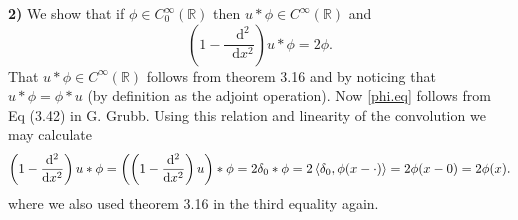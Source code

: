 \documentclass[a4paper,11pt]{article}
\newcommand*\diff{\mathop{}\!\mathrm{d}}
\newcommand{\R}{\mathbb{R}}
\numberwithin{equation}{section}
\begin{document}
\textbf{2)} We show that if $ \phi\in C^\infty_0(\R) $ then $ u\ast\phi\in C^\infty(\R) $ and \begin{equation}\label{phi.eq}
\left(1-\frac{\diff^2}{\diff x^2}\right)u\ast\phi=2\phi.
\end{equation}
That $ u\ast \phi\in C^\infty(\R) $ follows from theorem 3.16 and by noticing that $ u\ast\phi=\phi\ast u $ (by definition as the adjoint operation). Now \eqref{phi.eq} follows from Eq (3.42) in G. Grubb. Using this relation and linearity of the convolution we may calculate\begin{equation}
\left(1-\frac{\diff^2}{\diff x^2}\right)u\ast\phi=\left(\left(1-\frac{\diff^2}{\diff x^2}\right)u\right)\ast\phi=2\delta_0\ast\phi=2\braket{\delta_0,\phi(x-\cdot)}=2\phi(x-0)=2\phi(x).
\end{equation}
where we also used theorem 3.16 in the third equality again.
\end{document}
